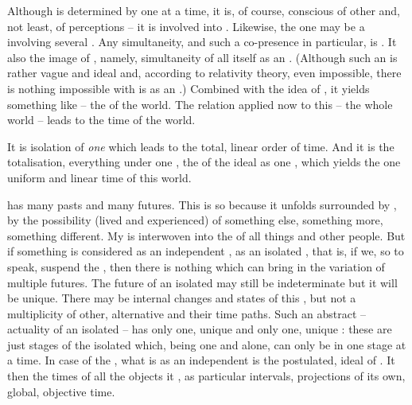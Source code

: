 Although  is determined by  one  at a
time, it is, of course, conscious of other  and, not least, of
perceptions -- it is involved into . Likewise, the one  may be a  involving several .
Any simultaneity, and such a co-presence in particular, is .  It
 also the image of , namely, simultaneity of all
  itself as an . (Although such an
 is rather vague and ideal and, according to relativity theory, even
impossible, there is nothing impossible with  is as an
.) Combined with the idea of , it yields something like
 -- the
 of the world.
The relation  applied now to this  -- the whole 
world -- leads to the time of the world. 

\pa
It is isolation of {\em one}  which leads to the total, linear order of
time. And it is the totalisation,  everything under one ,
the 
 of the ideal  as one , which
yields the one uniform and linear time of this world. 

 has many pasts and many futures.  This is so because
it unfolds surrounded by , by the possibility (lived and
experienced) of something else, something more, something different. My
 is interwoven into the  of all things and other
people. But if something is considered as an independent , as an
isolated , that is, if we, so to speak, suspend the
, then there is nothing which can bring in the variation of
multiple futures. The future of an isolated  may still be
indeterminate but it will be unique.  There may be internal changes and states
of this , but not a multiplicity of other, alternative 
and their time paths.  Such an abstract  -- actuality of an isolated
 -- has only one, unique  and only one, unique :
these are just stages of the isolated  which, being one and alone,
can only be in one stage at a time. In case of the , what is
 as an independent  is the postulated, ideal
 of . It then  the times of all the
objects it , as particular intervals, projections of its own,
global, objective time.

